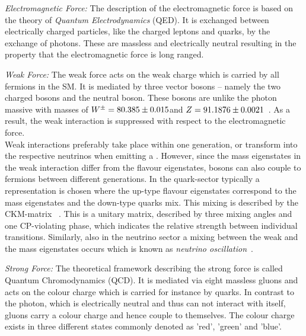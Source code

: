 \begin{description}
 \begin{description}
  \item \textit{Electromagnetic Force:} The description of the electromagnetic force is based on the theory of \textit{Quantum Electrodynamics} (QED). It is exchanged between electrically charged particles, like the charged leptons and quarks, by the exchange of photons. These are massless and electrically neutral resulting in the property that the electromagnetic force is long ranged.
  \item \textit{Weak Force:} The weak force acts on the weak charge which is carried by all fermions in the SM. It is mediated by three vector bosons -- namely the two charged \Wpm bosons and the neutral \Z boson. These bosons are unlike the photon massive with masses of $W^{\pm} = 80.385 \pm 0.015$\gev and $Z = 91.1876 \pm 0.0021$\gev~\cite{bib:PDG:2012}. As a result, the weak interaction is suppressed with respect to the electromagnetic force. \\
Weak interactions preferably take place within one generation, \eg \lel or \lmu transform into the respective neutrinos when emitting a \Wm. However, since the mass eigenstates in the weak interaction differ from the flavour eigenstates, \Wpm bosons can also couple to fermions between different generations. In the quark-sector typically a representation is chosen where the up-type flavour eigenstates correspond to the mass eigenstates and the down-type quarks mix. This mixing is described by the CKM-matrix ~\cite{PhysRevLett.10.531, PTP.49.652}. This is a unitary matrix, described by three mixing angles and one CP-violating phase, which indicates the relative strength between individual transitions. Similarly, also in the neutrino sector a mixing between the weak and the mass eigenstates occurs which is known as \textit{neutrino oscillation}~\cite{Maki:1962mu, Pontecorvo:1967fh, Fukuda:1998mi}.
  \item \textit{Strong Force:} The theoretical framework describing the strong force is called Quantum Chromodynamics (QCD). It is mediated via eight massless gluons and acts on the colour charge which is carried for instance by quarks. In contrast to the photon, which is electrically neutral and thus can not interact with itself, gluons carry a colour charge and hence couple to themselves. The colour charge exists in three different states commonly denoted as 'red', 'green' and 'blue'. \\

\end{description}
\end{description}
